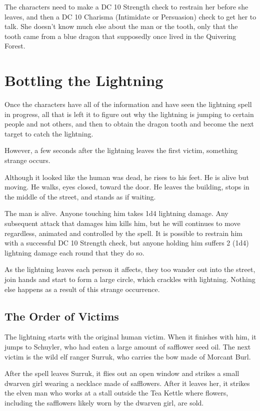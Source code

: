 \documentclass[10pt,a4paper,twoside,bg=print,twocolumn,openany,nodeprecatedcode]{dndbook}
\begin{document}
The characters need to make a DC 10 Strength check to restrain her before she leaves, and then a DC 10 Charisma (Intimidate or Persuasion) check to get her to talk. She doesn't know much else about the man or the tooth, only that the tooth came from a blue dragon that supposedly once lived in the Quivering Forest.

\section{Bottling the Lightning}
Once the characters have all of the information and have seen the lightning spell in progress, all that is left it to figure out why the lightning is jumping to certain people and not others, and then to obtain the dragon tooth and become the next target to catch the lightning.

However, a few seconds after the lightning leaves the first victim, something strange occurs.

\begin{DndReadAloud}{}
Although it looked like the human was dead, he rises to his feet. He is alive but moving. He walks, eyes closed, toward the door. He leaves the building, stops in the middle of the street, and stands as if waiting.

\end{DndReadAloud}

The man is alive. Anyone touching him takes 1d4 lightning damage. Any subsequent attack that damages him kills him, but he will continues to move regardless, animated and controlled by the spell. It is possible to restrain him with a successful DC 10 Strength check, but anyone holding him suffers 2 (1d4) lightning damage each round that they do so.

As the lightning leaves each person it affects, they too wander out into the street, join hands and start to form a large circle, which crackles with lightning. Nothing else happens as a result of this strange occurrence.

\subsection{The Order of Victims}
The lightning starts with the original human victim. When it finishes with him, it jumps to Schuyler, who had eaten a large amount of safflower seed oil. The next victim is the wild elf ranger Surruk, who carries the bow made of Morcant Burl.

After the spell leaves Surruk, it flies out an open window and strikes a small dwarven girl wearing a necklace made of safflowers. After it leaves her, it strikes the elven man who works at a stall outside the Tea Kettle where flowers, including the safflowers likely worn by the dwarven girl, are sold.
\end{document}
